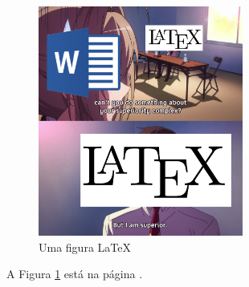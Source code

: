 \documentclass[12pt]{article}
\begin{document}
\begin{figure}
	\centering
	\includegraphics[width=0.6\textwidth]{meme_superior.png}
	\caption{Uma figura \LaTeX}
	\label{fig:meme}
\end{figure}

A Figura \ref{fig:meme} está na página \pageref{fig:meme}.
\end{document}
